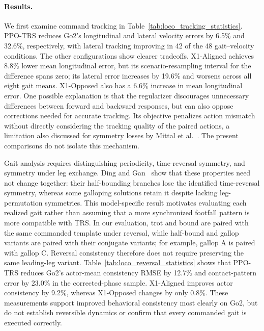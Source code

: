 \paragraph{Results.}
We first examine command tracking in Table~\ref{tab:loco_tracking_statistics}. PPO-TRS reduces Go2's longitudinal and lateral velocity errors by 6.5\% and 32.6\%, respectively, with lateral tracking improving in 42 of the 48 gait--velocity conditions. The other configurations show clearer tradeoffs. X1-Aligned achieves 8.8\% lower mean longitudinal error, but its scenario-resampling interval for the difference spans zero; its lateral error increases by 19.6\% and worsens across all eight gait means. X1-Opposed also has a 6.6\% increase in mean longitudinal error. One possible explanation is that the regularizer discourages unnecessary differences between forward and backward responses, but can also oppose corrections needed for accurate tracking. Its objective penalizes action mismatch without directly considering the tracking quality of the paired actions, a limitation also discussed for symmetry losses by Mittal et al.~\cite{mittal2024symmetry}. The present comparisons do not isolate this mechanism.

Gait analysis requires distinguishing periodicity, time-reversal symmetry, and symmetry under leg exchange. Ding and Gan~\cite{ding2024breaking} show that these properties need not change together: their half-bounding branches lose the identified time-reversal symmetry, whereas some galloping solutions retain it despite lacking leg-permutation symmetries. This model-specific result motivates evaluating each realized gait rather than assuming that a more synchronized footfall pattern is more compatible with TRS. In our evaluation, trot and bound are paired with the same commanded template under reversal, while half-bound and gallop variants are paired with their conjugate variants; for example, gallop A is paired with gallop C. Reversal consistency therefore does not require preserving the same leading-leg variant. Table~\ref{tab:loco_reversal_statistics} shows that PPO-TRS reduces Go2's actor-mean consistency RMSE by 12.7\% and contact-pattern error by 23.0\% in the corrected-phase sample. X1-Aligned improves actor consistency by 9.2\%, whereas X1-Opposed changes by only 0.8\%. These measurements support improved behavioral consistency most clearly on Go2, but do not establish reversible dynamics or confirm that every commanded gait is executed correctly.

